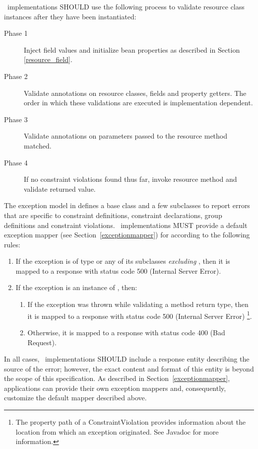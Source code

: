 \jaxrs\ implementations SHOULD use the following process to validate resource class instances after they have been instantiated:

\begin{description}
\item[Phase 1] Inject field values and initialize bean properties as described in Section \ref{resource_field}.
\item[Phase 2] Validate annotations on resource classes, fields and property getters. The order in which these validations are executed is implementation dependent.
\item[Phase 3] Validate annotations on parameters passed to the resource method matched. 
\item[Phase 4] If no constraint violations found thus far, invoke resource method and validate returned value. 
\end{description}

The exception model in \cite{bv11} defines a base class  and a few subclasses to report errors that are specific to constraint definitions, constraint declarations, group definitions and constraint violations. \jaxrs\ implementations MUST provide a default exception mapper (see Section~\ref{exceptionmapper}) for  according to the following rules:

\begin{enumerate}
\item If the exception is of type  or any of its subclasses {\em excluding} , then it is mapped to a response with status code 500 (Internal Server Error).
\item If the exception is an instance of , then:
\begin{enumerate}
\item If the exception was thrown while validating a method return type, then it is mapped to a response with status code 500 (Internal Server Error) \footnote{The property path of a {\code ConstraintViolation} provides information about the location from which an exception originated. See Javadoc for more information.}.
\item Otherwise, it is mapped to a response with status code 400 (Bad Request). 
\end{enumerate}
\end{enumerate}

In all cases, \jaxrs\ implementations SHOULD include a response entity describing the source of the error; however, the exact content and format of this entity is beyond the scope of this specification. As described in Section~\ref{exceptionmapper}, applications can provide their own exception mappers and, consequently, customize the default mapper described above.





